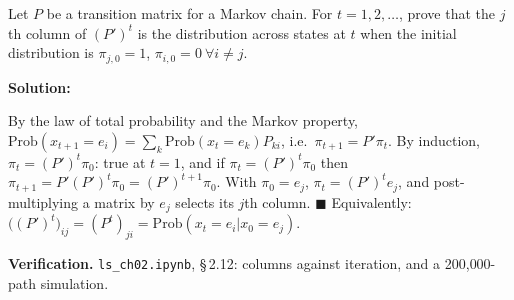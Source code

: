 \documentclass[12pt, letterpaper]{article}
\newcommand{\nb}[1]{\texttt{ls\_ch02.ipynb}, \S\,#1}
\begin{document}
\begin{tcolorbox}[evenbox,title={Exercise 2.12 \quad Columns of $(P')^t$}]
\begin{tcolorbox}[questionbox]
Let $P$ be a transition matrix for a Markov chain. For $t=1,2,\dots$, prove that the $j$th column of
$(P')^t$ is the distribution across states at $t$ when the initial distribution is $\pi_{j,0}=1$,
$\pi_{i,0}=0\ \forall i\neq j$.
\end{tcolorbox}

\textbf{Solution:}

By the law of total probability and the Markov property,
$\text{Prob}(x_{t+1}=e_i)=\sum_k\text{Prob}(x_t=e_k)P_{ki}$, i.e.\ $\pi_{t+1}=P'\pi_t$. By induction,
$\pi_t=(P')^t\pi_0$: true at $t=1$, and if $\pi_t=(P')^t\pi_0$ then $\pi_{t+1}=P'(P')^t\pi_0=(P')^{t+1}\pi_0$.
With $\pi_0=e_j$, $\pi_t=(P')^te_j$, and post-multiplying a matrix by $e_j$ selects its $j$th column.
$\blacksquare$ Equivalently: $\big((P')^t\big)_{ij}=(P^t)_{ji}=\text{Prob}(x_t=e_i|x_0=e_j)$.

\textbf{Verification.} \nb{2.12}: columns against iteration, and a 200{,}000-path simulation. \checkmark
\end{tcolorbox}
\end{document}
